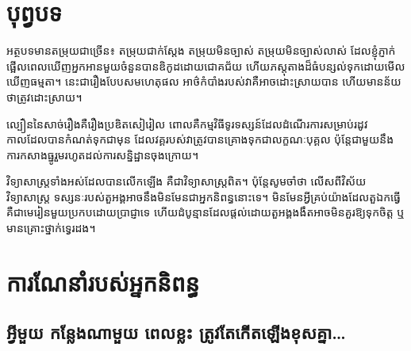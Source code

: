 \chapter*{បុព្វបទ}

អត្ថបទមានតម្រុយជាច្រើន៖ តម្រុយជាក់ស្តែង តម្រុយមិនច្បាស់ តម្រុយមិនច្បាស់លាស់ ដែលខ្ញុំភ្ញាក់ផ្អើលពេលឃើញអ្នកអានមួយចំនួនបានឌិកូដដោយជោគជ័យ ហើយភស្តុតាងដ៏ធំបន្សល់ទុកដោយមើលឃើញធម្មតា។ នេះជារឿងបែបសមហេតុផល អាថ៌កំបាំង​របស់​វា​គឺ​អាច​ដោះស្រាយ​បាន ហើយ​មាន​ន័យ​ថា​ត្រូវ​ដោះស្រាយ។

ល្បឿននៃសាច់រឿងគឺរឿងប្រឌិតសៀរៀល ពោលគឺកម្មវិធីទូរទស្សន៍ដែលដំណើរការសម្រាប់រដូវកាលដែលបានកំណត់ទុកជាមុន ដែលវគ្គរបស់វាត្រូវបានគ្រោងទុកជាលក្ខណៈបុគ្គល ប៉ុន្តែជាមួយនឹងការកសាងធ្នូរួមរហូតដល់ការសន្និដ្ឋានចុងក្រោយ។


វិទ្យាសាស្ត្រទាំងអស់ដែលបានលើកឡើង គឺជាវិទ្យាសាស្ត្រពិត។ ប៉ុន្តែ​សូម​ចាំ​ថា លើស​ពី​វិស័យ​វិទ្យាសាស្ត្រ ទស្សនៈ​របស់​តួអង្គ​អាច​នឹង​មិន​មែន​ជា​អ្នក​និពន្ធ​នោះ​ទេ។ មិនមែនអ្វីគ្រប់យ៉ាងដែលតួឯកធ្វើគឺជាមេរៀនមួយប្រកបដោយប្រាជ្ញាទេ ហើយដំបូន្មានដែលផ្តល់ដោយតួអង្គងងឹតអាចមិនគួរឱ្យទុកចិត្ត ឬមានគ្រោះថ្នាក់ទ្វេរដង។

\chapter*{ការណែនាំរបស់អ្នកនិពន្ធ}

\section*{អ្វីមួយ កន្លែងណាមួយ ពេលខ្លះ ត្រូវតែកើតឡើងខុសគ្នា…}

